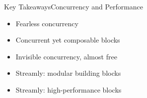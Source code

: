 \documentclass[17pt]{beamer}
\begin{document}
%
\begin{frame}{Key Takeaways}{Concurrency and Performance}
\begin{itemize}
  \item Fearless concurrency
  \item Concurrent yet composable blocks
  \item Invisible concurrency, almost free %
  \item Streamly: modular building blocks
  \item Streamly: high-performance blocks
\end{itemize}
\end{frame}


\end{document}
